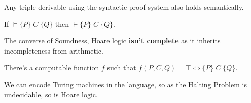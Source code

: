 \documentclass[a4paper, 11pt]{article}
\newcommand{\triple}[3]{\{#1\}\;#2\;\{#3\}}
\begin{document}
{{\begin{description}
{            Any triple derivable using the syntactic proof system also holds semantically.
        }
        \item[\sout{Completeness}:]
        {
            If \(\vDash\triple{P}{C}{Q}\) then \(\vdash\triple{P}{C}{Q}\).

            The converse of Soundness, Hoare logic \textbf{isn't complete} as it inherits incompleteness from arithmetic.
        }
        \item[\sout{Decidability}:]
        {
            There's a computable function \(f\) such that \(f(P,C,Q) = \top \Longleftrightarrow \triple{P}{C}{Q}\).

            We can encode Turing machines in the  language, so as the Halting Problem is undecidable, so is Hoare logic.
        }
        \end{description}
    }
}
\end{document}
